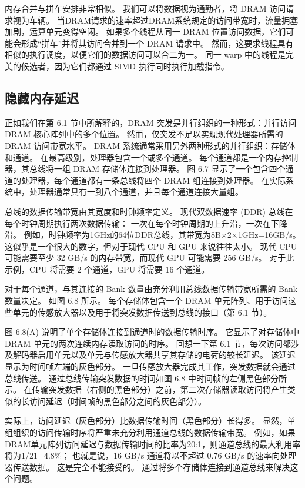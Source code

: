 内存合并与拼车安排非常相似。 我们可以将数据视为通勤者，将 DRAM 访问请求视为车辆。 
当DRAM请求的速率超过DRAM系统规定的访问带宽时，流量拥塞加剧，运算单元变得空闲。 
如果多个线程从同一 DRAM 位置访问数据，它们可能会形成“拼车”并将其访问合并到一个 DRAM 请求中。 
然而，这要求线程具有相似的执行调度，以便它们的数据访问可以合二为一。 
同一 warp 中的线程是完美的候选者，因为它们都通过 SIMD 执行同时执行加载指令。

\subsection{隐藏内存延迟}
正如我们在第 6.1 节中所解释的，DRAM 突发是并行组织的一种形式：并行访问 DRAM 核心阵列中的多个位置。 
然而，仅突发不足以实现现代处理器所需的 DRAM 访问带宽水平。 DRAM 系统通常采用另外两种形式的并行组织：存储体和通道。 
在最高级别，处理器包含一个或多个通道。 每个通道都是一个内存控制器，其总线将一组 DRAM 存储体连接到处理器。 
图 6.7 显示了一个包含四个通道的处理器，每个通道都有一条总线将四个 DRAM 组连接到处理器。 
在实际系统中，处理器通常具有一到八个通道，并且每个通道连接大量组。

总线的数据传输带宽由其宽度和时钟频率定义。 现代双数据速率 (DDR) 总线在每个时钟周期执行两次数据传输：
一次在每个时钟周期的上升沿，一次在下降沿。 例如，时钟频率为1GHz的64位DDR总线，其带宽为8B×2×1GHz=16GB/s。 
这似乎是一个很大的数字，但对于现代 CPU 和 GPU 来说往往太小。 
现代 CPU 可能需要至少 32 GB/s 的内存带宽，而现代 GPU 可能需要 256 GB/s。 
对于此示例，CPU 将需要 2 个通道，GPU 将需要 16 个通道。

对于每个通道，与其连接的 Bank 数量由充分利用总线数据传输带宽所需的 Bank 数量决定。 如图 6.8 所示。 
每个存储体包含一个 DRAM 单元阵列、用于访问这些单元的传感放大器以及用于将突发数据传送到总线的接口（第 6.1 节）。

图 6.8(A) 说明了单个存储体连接到通道时的数据传输时序。 它显示了对存储体中 DRAM 单元的两次连续内存读取访问的时序。 
回想一下第 6.1 节，每次访问都涉及解码器启用单元以及单元与传感放大器共享其存储的电荷的较长延迟。 
该延迟显示为时间帧左端的灰色部分。 一旦传感放大器完成其工作，突发数据就会通过总线传送。 
通过总线传输突发数据的时间如图 6.8 中时间帧的左侧黑色部分所示。 
在传输突发数据（右侧的黑色部分）之前，第二次存储器读取访问将产生类似的长访问延迟（时间帧的黑色部分之间的灰色部分）。

实际上，访问延迟（灰色部分）比数据传输时间（黑色部分）长得多。 
显然，单组组织的访问传输时序将严重未充分利用通道总线的数据传输带宽。 
例如，如果DRAM单元阵列访问延迟与数据传输时间的比率为20:1，则通道总线的最大利用率将为1/21=4.8\%； 
也就是说，16 GB/s 通道将以不超过 0.76 GB/s 的速率向处理器传送数据。 
这是完全不能接受的。 通过将多个存储体连接到通道总线来解决这个问题。

